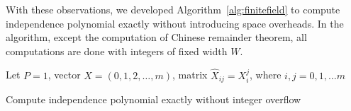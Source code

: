 \documentclass[review,onefignum,onetabnum]{siamart190516}
\newcommand{\<}{\langle}
\renewcommand{\>}{\rangle}
\begin{document}
With these observations, we developed Algorithm~\ref{alg:finitefield} to compute independence polynomial exactly without introducing space overheads.
In the algorithm, except the computation of Chinese remainder theorem, all computations are done with integers of fixed width $W$.

\begin{algorithm}[!ht]
    \small
    \SetAlgoNoLine
    \LinesNumbered
    Let $P = 1$, vector $X = (0,1,2,\ldots,m)$, matrix $\hat X_{ij} = X_i^j$, where $i,j = 0, 1, \ldots m$\;

    \caption{Compute independence polynomial exactly without integer overflow}\label{alg:finitefield}
\end{algorithm}
\end{document}
